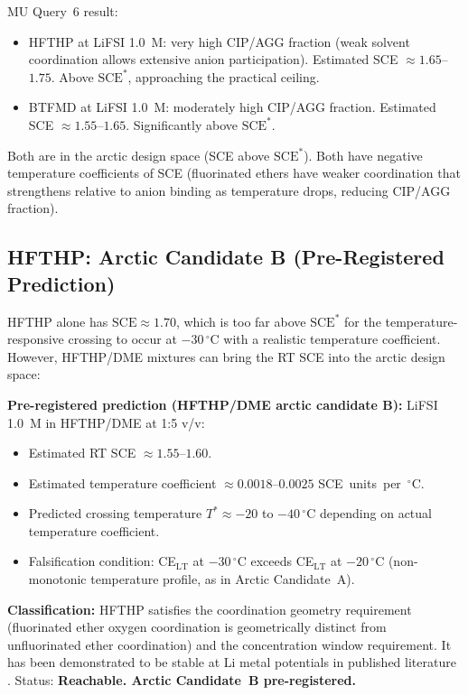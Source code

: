 \documentclass[11pt]{article}
\theoremstyle{plain}
\theoremstyle{definition}
\theoremstyle{remark}
\begin{document}
MU Query~6 result:
\begin{itemize}[leftmargin=2em]
  \item HFTHP at LiFSI 1.0~M: very high CIP/AGG fraction
        (weak solvent coordination allows extensive anion
        participation).  Estimated SCE $\approx 1.65$--$1.75$.
        Above $\mathrm{SCE}^{*}$, approaching the practical ceiling.
  \item BTFMD at LiFSI 1.0~M: moderately high CIP/AGG fraction.
        Estimated SCE $\approx 1.55$--$1.65$.  Significantly above
        $\mathrm{SCE}^{*}$.
\end{itemize}

Both are in the arctic design space (SCE above $\mathrm{SCE}^{*}$).
Both have negative temperature coefficients of SCE (fluorinated
ethers have weaker coordination that strengthens relative to
anion binding as temperature drops, reducing CIP/AGG fraction).

\subsection{HFTHP: Arctic Candidate B (Pre-Registered Prediction)}

HFTHP alone has $\mathrm{SCE} \approx 1.70$, which is too far
above $\mathrm{SCE}^{*}$ for the temperature-responsive crossing
to occur at $-30\,^\circ$C with a realistic temperature
coefficient.  However, HFTHP/DME mixtures can bring the RT SCE
into the arctic design space:

\textbf{Pre-registered prediction (HFTHP/DME arctic candidate B):}
LiFSI 1.0~M in HFTHP/DME at 1:5 v/v:
\begin{itemize}[leftmargin=2em]
  \item Estimated RT SCE $\approx 1.55$--$1.60$.
  \item Estimated temperature coefficient $\approx 0.0018$--$0.0025$
        SCE~units~per~$^\circ$C.
  \item Predicted crossing temperature $T^{*} \approx -20$ to
        $-40\,^\circ$C depending on actual temperature coefficient.
  \item Falsification condition: CE$_\mathrm{LT}$ at $-30\,^\circ$C
        exceeds CE$_\mathrm{LT}$ at $-20\,^\circ$C (non-monotonic
        temperature profile, as in Arctic Candidate~A).
\end{itemize}

\textbf{Classification:} HFTHP satisfies the coordination geometry
requirement (fluorinated ether oxygen coordination is geometrically
distinct from unfluorinated ether coordination) and the
concentration window requirement.  It has been demonstrated
to be stable at Li metal potentials in published literature
\cite{Holoubek2021}.  Status: \textbf{Reachable.  Arctic
Candidate~B pre-registered.}
\end{document}
